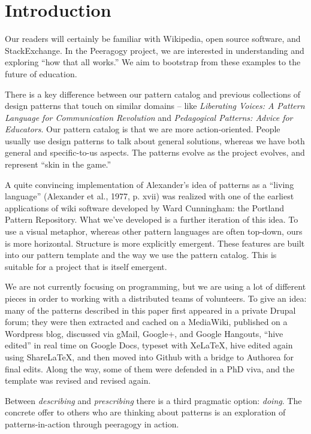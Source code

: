 \section{Introduction}

Our readers will certainly be familiar with Wikipedia, open source software, and StackExchange.  In the Peeragogy project, we are interested in understanding and exploring ``how that all works.''  We aim to bootstrap from these examples to the future of education.

There is a key difference between our pattern catalog and previous collections of design patterns that touch on similar domains -- like \emph{Liberating Voices: A Pattern Language for Communication Revolution} and \emph{Pedagogical Patterns: Advice for Educators}.  Our pattern catalog is that we are more action-oriented.  People usually use design patterns to talk about general solutions, whereas we have both general and specific-to-us aspects. The patterns evolve as the project evolves, and represent ``skin in the game.''

A quite convincing implementation of Alexander’s idea of patterns as a “living language” (Alexander et
al., 1977, p. xvii) was realized with one of the earliest applications of wiki
software developed by Ward Cunningham: the Portland Pattern Repository.
What we've developed is a further iteration of this idea. To use a visual metaphor, whereas other pattern languages are often top-down, ours is more horizontal.  Structure is more explicitly emergent.  These features are built
into our pattern template and the way we use the pattern catalog.  This is suitable for a project
that is itself emergent.

We are not currently focusing on programming, but we are using a lot of different pieces in order to working with a distributed teams of volunteers.  To give an idea: many of the patterns described in this paper first appeared in a private Drupal forum; they were then extracted and cached on a MediaWiki, published on a Wordpress blog, discussed via gMail, Google+, and Google Hangouts, ``hive edited'' in real time on Google Docs, typeset with XeLaTeX, hive edited again using ShareLaTeX, and then moved into Github with a bridge to Authorea for final edits.  Along the way, some of them were defended in a PhD viva, and the template was revised and revised again.

Between \emph{describing} and \emph{prescribing} there is a third pragmatic option: \emph{doing}.
The concrete offer to others who are thinking about patterns is an exploration of patterns-in-action
through peeragogy in action.